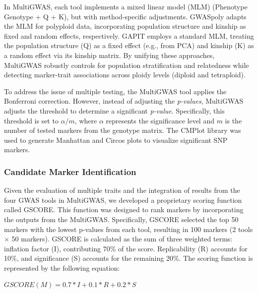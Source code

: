 \documentclass[pdflatex,sn-mathphys-ay]{sn-jnl}%
\begin{document}
In MultiGWAS, each tool implements a mixed linear model (MLM) (Phenotype ~ Genotype + Q + K), but with method-specific adjustments. GWASpoly adapts the MLM for polyploid data, incorporating population structure and kinship as fixed and random effects, respectively. GAPIT employs a standard MLM, treating the population structure (Q) as a fixed effect (e.g., from PCA) and kinship (K) as a random effect via its kinship matrix. By unifying these approaches, MultiGWAS robustly controls for population stratification and relatedness while detecting marker-trait associations across ploidy levels (diploid and tetraploid).




To address the issue of multiple testing, the MultiGWAS tool applies the Bonferroni correction. However, instead of adjusting the \textit{p-values}, MultiGWAS adjusts the threshold to determine a significant \textit{p-value}. Specifically, this threshold is set to $\alpha/m$, where $\alpha$ represents the significance level and $m$ is the number of tested markers from the genotype matrix. The CMPlot library \citep{CMPlot} was used to generate Manhattan and Circos plots to visualize significant SNP markers.


\subsubsection*{Candidate Marker Identification \label{score}}


Given the evaluation of multiple traits and the integration of results from the four GWAS tools in MultiGWAS, we developed a proprietary scoring function called GSCORE. This function was designed to rank markers by incorporating the outputs from the MultiGWAS. Specifically, GSCORE selected the top 50 markers with the lowest p-values from each tool, resulting in 100 markers (2 tools × 50 markers). GSCORE is calculated as the sum of three weighted terms: inflation factor (I), contributing 70\% of the score. Replicability (R) accounts for 10\%, and significance (S) accounts for the remaining 20\%. The scoring function is represented by the following equation:

\begin{center}
$GSCORE(M)=0.7*I+0.1*R+0.2*S$
\par\end{center}
\end{document}

